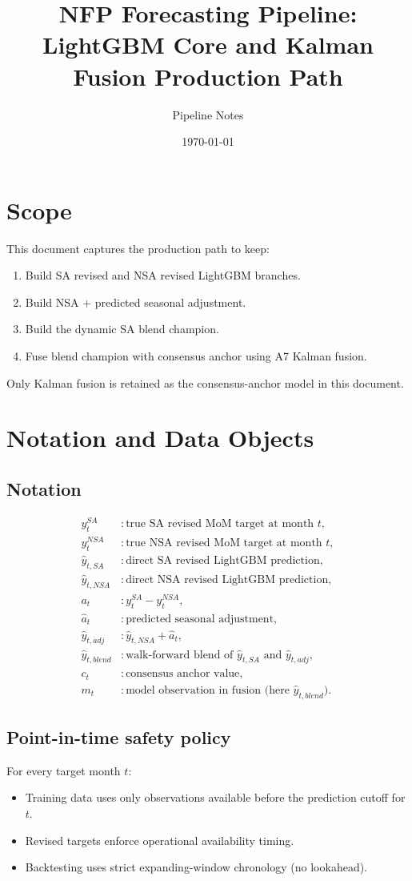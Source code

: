 \documentclass[11pt]{article}
\title{NFP Forecasting Pipeline: LightGBM Core and Kalman Fusion Production Path}
\author{Pipeline Notes}
\date{\today}
\begin{document}
\maketitle
\tableofcontents
\newpage

\section{Scope}
This document captures the production path to keep:
\begin{enumerate}
    \item Build SA revised and NSA revised LightGBM branches.
    \item Build NSA + predicted seasonal adjustment.
    \item Build the dynamic SA blend champion.
    \item Fuse blend champion with consensus anchor using A7 Kalman fusion.
\end{enumerate}
Only Kalman fusion is retained as the consensus-anchor model in this document.

\section{Notation and Data Objects}
\subsection{Notation}
\begin{align*}
 y_t^{SA} &: \text{true SA revised MoM target at month } t,\\
 y_t^{NSA} &: \text{true NSA revised MoM target at month } t,\\
 \hat{y}_{t,SA} &: \text{direct SA revised LightGBM prediction},\\
 \hat{y}_{t,NSA} &: \text{direct NSA revised LightGBM prediction},\\
 a_t &: y_t^{SA}-y_t^{NSA},\\
 \hat{a}_t &: \text{predicted seasonal adjustment},\\
 \hat{y}_{t,adj} &: \hat{y}_{t,NSA}+\hat{a}_t,\\
 \hat{y}_{t,blend} &: \text{walk-forward blend of }\hat{y}_{t,SA}\text{ and }\hat{y}_{t,adj},\\
 c_t &: \text{consensus anchor value},\\
 m_t &: \text{model observation in fusion (here }\hat{y}_{t,blend}\text{)}.
\end{align*}

\subsection{Point-in-time safety policy}
For every target month $t$:
\begin{itemize}
    \item Training data uses only observations available before the prediction cutoff for $t$.
    \item Revised targets enforce operational availability timing.
    \item Backtesting uses strict expanding-window chronology (no lookahead).
\end{itemize}
\end{document}
